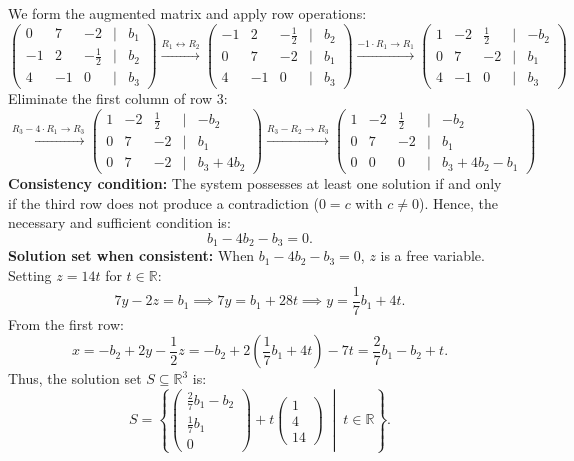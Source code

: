 \begin{exercisesolution*}
\label{sol:parametric_linear_system_solvability}
We form the augmented matrix and apply row operations:
\[
\begin{pmatrix}
0 & 7 & -2 & \big| & b_1 \\
-1 & 2 & -\frac{1}{2} & \big| & b_2 \\
4 & -1 & 0 & \big| & b_3
\end{pmatrix}
\xrightarrow{R_1 \leftrightarrow R_2}
\begin{pmatrix}
-1 & 2 & -\frac{1}{2} & \big| & b_2 \\
0 & 7 & -2 & \big| & b_1 \\
4 & -1 & 0 & \big| & b_3
\end{pmatrix}
\xrightarrow{-1 \cdot R_1 \to R_1}
\begin{pmatrix}
1 & -2 & \frac{1}{2} & \big| & -b_2 \\
0 & 7 & -2 & \big| & b_1 \\
4 & -1 & 0 & \big| & b_3
\end{pmatrix}
\]
Eliminate the first column of row 3:
\[
\xrightarrow{R_3 - 4 \cdot R_1 \to R_3}
\begin{pmatrix}
1 & -2 & \frac{1}{2} & \big| & -b_2 \\
0 & 7 & -2 & \big| & b_1 \\
0 & 7 & -2 & \big| & b_3 + 4b_2
\end{pmatrix}
\xrightarrow{R_3 - R_2 \to R_3}
\begin{pmatrix}
1 & -2 & \frac{1}{2} & \big| & -b_2 \\
0 & 7 & -2 & \big| & b_1 \\
0 & 0 & 0 & \big| & b_3 + 4b_2 - b_1
\end{pmatrix}
\]
\textbf{Consistency condition:} The system possesses at least one solution if and only if the third row does not produce a contradiction ($0 = c$ with $c \ne 0$). Hence, the necessary and sufficient condition is:
\[
b_1 - 4b_2 - b_3 = 0.
\]
\textbf{Solution set when consistent:} When $b_1 - 4b_2 - b_3 = 0$, $z$ is a free variable. Setting $z = 14t$ for $t \in \mathbb{R}$:
\[
7y - 2z = b_1 \implies 7y = b_1 + 28t \implies y = \frac{1}{7}b_1 + 4t.
\]
From the first row:
\[
x = -b_2 + 2y - \frac{1}{2}z = -b_2 + 2\left(\frac{1}{7}b_1 + 4t\right) - 7t = \frac{2}{7}b_1 - b_2 + t.
\]
Thus, the solution set $S \subseteq \mathbb{R}^3$ is:
\[
S = \left\{ \begin{pmatrix} \frac{2}{7}b_1 - b_2 \\ \frac{1}{7}b_1 \\ 0 \end{pmatrix} + t \begin{pmatrix} 1 \\ 4 \\ 14 \end{pmatrix} \;\middle|\; t \in \mathbb{R} \right\}.
\]
\end{exercisesolution*}

